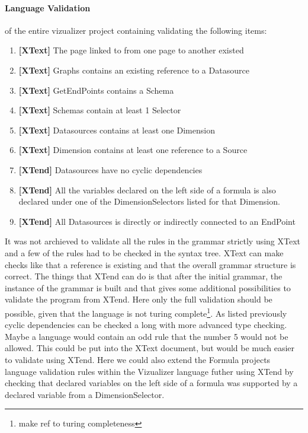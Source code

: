 \paragraph{Language Validation}
of the entire vizualizer project containing validating the following items:
\begin{enumerate}
\item \textbf{[XText]} The page linked to from one page to another existed
\item \textbf{[XText]} Graphs contains an existing reference to a Datasource
\item \textbf{[XText]} GetEndPoints contains a Schema
\item \textbf{[XText]} Schemas contain at least 1 Selector
\item \textbf{[XText]} Datasources contains at least one Dimension
\item \textbf{[XText]} Dimension contains at least one reference to a Source
\item \textbf{[XTend]} Datasources have no cyclic dependencies
\item \textbf{[XTend]} All the variables declared on the left side of a formula is also declared under one of the DimensionSelectors listed for that Dimension.
\item \textbf{[XTend]} All Datasources is directly or indirectly connected to an EndPoint
\end{enumerate}

It was not archieved to validate all the rules in the grammar strictly using XText and a few
of the rules had to be checked in the syntax tree. XText can make checks like that a reference is
existing and that the overall grammar structure is correct.
The things that XTend can do is that after the initial grammar, the instance of the grammar is
built and that gives some additional possibilities to validate the program from XTend. Here
only the full validation should be possible, given that the language is not turing
complete\footnote{make ref to turing completeness}. As listed previously cyclic dependencies
can be checked a long with more advanced type checking. Maybe a language would contain an odd
rule that the number 5 would not be allowed. This could be put into the XText document,
but would be much easier to validate using XTend. Here we could also extend the Formula projects
language validation rules within the Vizualizer language futher using XTend by checking that
declared variables on the left side of a formula was supported by a declared variable from
a DimensionSelector. 


